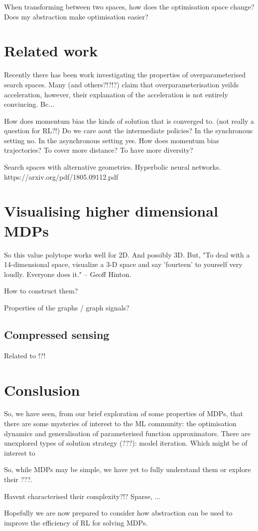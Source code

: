 When transforming between two spaces, how does the optimisation space
change? Does my abstraction make optimisation easier?


\section{Related work}

Recently there has been work investigating the properties of overparameterised search spaces.
Many \cite{Arora2018} (and others?!?!?) claim that overparameterisation yeilds acceleration, however,
their explanation of the acceleration is not entirely convincing. Bc...

How does momentum bias the kinds of solution that is converged to. (not really a question for RL?!)
Do we care aout the intermediate policies? In the synchronous setting no. In the asynchronous setting yes.
How does momentum bias trajectories? To cover more distance? To have more diversity?

Search spaces with alternative geometries.
Hyperbolic neural networks. https://arxiv.org/pdf/1805.09112.pdf


\section{Visualising higher dimensional MDPs}

So this value polytope works well for 2D. And possibly 3D. But,
"To deal with a 14-dimensional space, visualize a 3-D space and say 'fourteen' to yourself very loudly. Everyone does it." -- Geoff Hinton.

How to construct them?

Properties of the graphs / graph signals?


\subsection{Compressed sensing}

Related to !?!


\section{Conslusion}

So, we have seen, from our brief exploration of some properties of MDPs, that
there are some mysteries of interest to the ML community: the optimisation dynamics and generalisation of
parameterised function approximators.
There are unexplored types of solution strategy (???): model iteration. Which might be of interest to

So, while MDPs may be simple, we have yet to fully understand them or explore their ???.

Havent characterised their complexity?!? Sparse, ...

Hopefully we are now prepared to consider how abstraction can be used to improve the efficiency of RL for solving MDPs.
